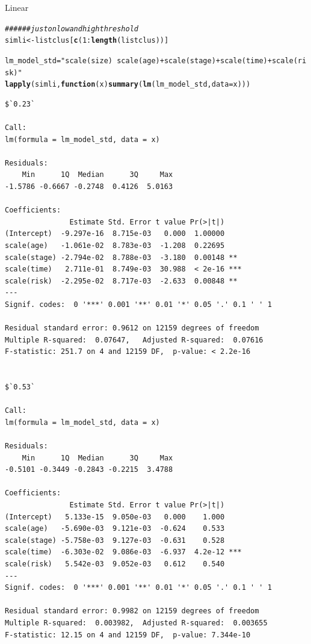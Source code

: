 \documentclass[]{revtex4}\usepackage[]{graphicx}\usepackage[]{color}
\makeatletter
\newcommand{\hlnum}[1]{\textcolor[rgb]{0.686,0.059,0.569}{#1}}%
\newcommand{\hlstr}[1]{\textcolor[rgb]{0.192,0.494,0.8}{#1}}%
\newcommand{\hlcom}[1]{\textcolor[rgb]{0.678,0.584,0.686}{\textit{#1}}}%
\newcommand{\hlopt}[1]{\textcolor[rgb]{0,0,0}{#1}}%
\newcommand{\hlstd}[1]{\textcolor[rgb]{0.345,0.345,0.345}{#1}}%
\newcommand{\hlkwa}[1]{\textcolor[rgb]{0.161,0.373,0.58}{\textbf{#1}}}%
\newcommand{\hlkwb}[1]{\textcolor[rgb]{0.69,0.353,0.396}{#1}}%
\newcommand{\hlkwc}[1]{\textcolor[rgb]{0.333,0.667,0.333}{#1}}%
\newcommand{\hlkwd}[1]{\textcolor[rgb]{0.737,0.353,0.396}{\textbf{#1}}}%
\newenvironment{kframe}{%
 \def\at@end@of@kframe{}%
 \ifinner\ifhmode%
  \def\at@end@of@kframe{\end{minipage}}%
  \begin{minipage}{\columnwidth}%
 \fi\fi%
 \def\FrameCommand##1{\hskip\@totalleftmargin \hskip-\fboxsep
 \colorbox{shadecolor}{##1}\hskip-\fboxsep
     \hskip-\linewidth \hskip-\@totalleftmargin \hskip\columnwidth}%
 \MakeFramed {\advance\hsize-\width
   \@totalleftmargin\z@ \linewidth\hsize
   \@setminipage}}%
 {\par\unskip\endMakeFramed%
 \at@end@of@kframe}
\newenvironment{knitrout}{}{} %
\makeatother
\begin{document}
Linear
\begin{knitrout}
\color{fgcolor}\begin{kframe}
\begin{alltt}
\hlcom{###### just on low and high threshold}
\hlstd{simli} \hlkwb{<-} \hlstd{listclus[}\hlkwd{c}\hlstd{(}\hlnum{1}\hlopt{:}\hlkwd{length}\hlstd{(listclus))]}

\hlstd{lm_model_std} \hlkwb{=} \hlstr{"scale(size) ~ scale(age) + scale(stage) + scale(time) + scale(risk)"}
\hlkwd{lapply}\hlstd{(simli ,} \hlkwa{function}\hlstd{(}\hlkwc{x}\hlstd{)} \hlkwd{summary}\hlstd{(}\hlkwd{lm}\hlstd{(lm_model_std,} \hlkwc{data} \hlstd{= x)))}
\end{alltt}
\begin{verbatim}
$`0.23`

Call:
lm(formula = lm_model_std, data = x)

Residuals:
    Min      1Q  Median      3Q     Max 
-1.5786 -0.6667 -0.2748  0.4126  5.0163 

Coefficients:
               Estimate Std. Error t value Pr(>|t|)    
(Intercept)  -9.297e-16  8.715e-03   0.000  1.00000    
scale(age)   -1.061e-02  8.783e-03  -1.208  0.22695    
scale(stage) -2.794e-02  8.788e-03  -3.180  0.00148 ** 
scale(time)   2.711e-01  8.749e-03  30.988  < 2e-16 ***
scale(risk)  -2.295e-02  8.717e-03  -2.633  0.00848 ** 
---
Signif. codes:  0 '***' 0.001 '**' 0.01 '*' 0.05 '.' 0.1 ' ' 1

Residual standard error: 0.9612 on 12159 degrees of freedom
Multiple R-squared:  0.07647,	Adjusted R-squared:  0.07616 
F-statistic: 251.7 on 4 and 12159 DF,  p-value: < 2.2e-16


$`0.53`

Call:
lm(formula = lm_model_std, data = x)

Residuals:
    Min      1Q  Median      3Q     Max 
-0.5101 -0.3449 -0.2843 -0.2215  3.4788 

Coefficients:
               Estimate Std. Error t value Pr(>|t|)    
(Intercept)   5.133e-15  9.050e-03   0.000    1.000    
scale(age)   -5.690e-03  9.121e-03  -0.624    0.533    
scale(stage) -5.758e-03  9.127e-03  -0.631    0.528    
scale(time)  -6.303e-02  9.086e-03  -6.937  4.2e-12 ***
scale(risk)   5.542e-03  9.052e-03   0.612    0.540    
---
Signif. codes:  0 '***' 0.001 '**' 0.01 '*' 0.05 '.' 0.1 ' ' 1

Residual standard error: 0.9982 on 12159 degrees of freedom
Multiple R-squared:  0.003982,	Adjusted R-squared:  0.003655 
F-statistic: 12.15 on 4 and 12159 DF,  p-value: 7.344e-10



\end{verbatim}
\end{kframe}
\end{knitrout}
\end{document}
